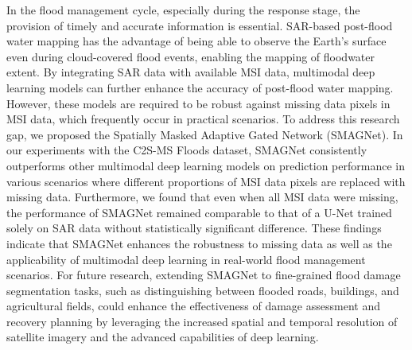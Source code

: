 \documentclass[preprint,12pt,authoryear]{elsarticle}
\begin{document}
In the flood management cycle, especially during the response stage, the provision of timely and accurate information is essential. SAR-based post-flood water mapping has the advantage of being able to observe the Earth's surface even during cloud-covered flood events, enabling the mapping of floodwater extent. By integrating SAR data with available MSI data, multimodal deep learning models can further enhance the accuracy of post-flood water mapping. However, these models are required to be robust against missing data pixels in MSI data, which frequently occur in practical scenarios. To address this research gap, we proposed the Spatially Masked Adaptive Gated Network (SMAGNet). In our experiments with the C2S-MS Floods dataset, SMAGNet consistently outperforms other multimodal deep learning models on prediction performance in various scenarios where different proportions of MSI data pixels are replaced with missing data. Furthermore, we found that even when all MSI data were missing, the performance of SMAGNet remained comparable to that of a U-Net trained solely on SAR data without statistically significant difference. These findings indicate that SMAGNet enhances the robustness to missing data as well as the applicability of multimodal deep learning in real-world flood management scenarios. For future research, extending SMAGNet to fine-grained flood damage segmentation tasks, such as distinguishing between flooded roads, buildings, and agricultural fields, could enhance the effectiveness of damage assessment and recovery planning by leveraging the increased spatial and temporal resolution of satellite imagery and the advanced capabilities of deep learning.


\end{document}
